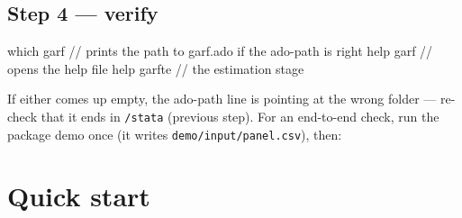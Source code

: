 \documentclass[11pt,a4paper]{article}
\newcommand{\code}[1]{\texttt{#1}}
\begin{document}
\subsection{Step 4 --- verify}
\begin{stata}
which garf     // prints the path to garf.ado if the ado-path is right
help garf      // opens the help file
help garfte    // the estimation stage
\end{stata}
If either comes up empty, the ado-path line is pointing at the wrong folder --- re-check that it
ends in \code{/stata} (previous step). For an end-to-end check, run the package demo once (it writes
\code{demo/input/panel.csv}), then:

\section{Quick start}
\end{document}
